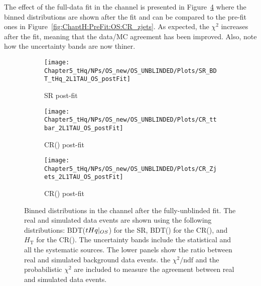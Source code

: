 The effect of the full-data fit in the \dilepOS channel is presented in Figure~\ref{fig:ChaptH:fitToData:OS:prepostfit} where the binned distributions are shown after the fit and can be compared to the pre-fit ones in Figure~\ref{fig:ChaptH:PreFit:OS:CR_zjets}.  
As expected, the $\chi^{2}$ increases after  the fit, meaning that the data/MC agreement has been improved. 
Also, note how the uncertainty bands are now thiner. 


\begin{figure}[ht]
    \centering
    \begin{subfigure}[b]{0.32\textwidth}
        \centering
        \texttt{[image: Chapter5\_tHq/NPs/OS\_new/OS\_UNBLINDED/Plots/SR\_BDT\_tHq\_2L1TAU\_OS\_postFit]}
        \caption{SR post-fit}
        \label{fig:ChaptH:fitToData:OS:prepostfit:postfit:SR}
    \end{subfigure}
    \hfill
    \begin{subfigure}[b]{0.32\textwidth}
        \centering
        \texttt{[image: Chapter5\_tHq/NPs/OS\_new/OS\_UNBLINDED/Plots/CR\_ttbar\_2L1TAU\_OS\_postFit]}
        \caption{CR(\ttbar) post-fit}
        \label{fig:ChaptH:fitToData:OS:prepostfit:postfit:CRtt}
    \end{subfigure}
    \hfill
    \begin{subfigure}[b]{0.32\textwidth}
        \centering
        \texttt{[image: Chapter5\_tHq/NPs/OS\_new/OS\_UNBLINDED/Plots/CR\_Zjets\_2L1TAU\_OS\_postFit]}
        \caption{CR(\Zjets) post-fit}
        \label{fig:ChaptH:fitToData:OS:prepostfit:postfit:CRZjet}
    \end{subfigure}
    \caption{Binned distributions in the \dilepOStau channel after  the fully-unblinded fit.
    The real and simulated data events are shown using the following distributions: BDT($tHq|_{OS}$) for the SR, 
    BDT(\ttbar) for the CR(\ttbar), and $H_{\text{T}}$ for the  CR(\Zjets). The uncertainty bands include the statistical and 
    all the systematic sources. The lower panels show the ratio between real and simulated background data events.
    the $\chi^{2}/\text{ndf}$ and the probabilistic $\chi^{2}$ are included to measure the agreement between 
    real and simulated data events.}
    \label{fig:ChaptH:fitToData:OS:prepostfit}
\end{figure}




